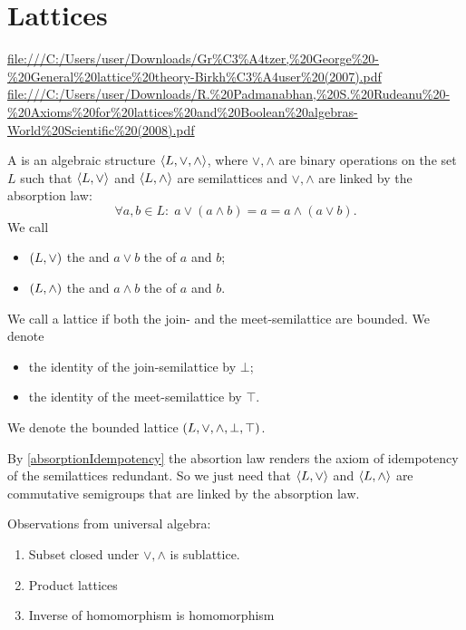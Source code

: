 \section{Lattices}
\url{file:///C:/Users/user/Downloads/Gr%C3%A4tzer,%20George%20-%20General%20lattice%20theory-Birkh%C3%A4user%20(2007).pdf}
\url{file:///C:/Users/user/Downloads/R.%20Padmanabhan,%20S.%20Rudeanu%20-%20Axioms%20for%20lattices%20and%20Boolean%20algebras-World%20Scientific%20(2008).pdf}
\begin{definition}
A  is an algebraic structure $\left\langle L,\vee, \wedge \right\rangle$, where $\vee, \wedge$ are binary operations on the set $L$ such that $\left\langle L,\vee \right\rangle$ and $\left\langle L,\wedge \right\rangle$ are semilattices and $\vee,\wedge$ are linked by the absorption law:
\[ \forall a,b\in L: \; a \vee (a \wedge b) = a = a \wedge (a\vee b). \]
We call
\begin{itemize}
\item $\left( L,\vee \right)$ the  and $a\vee b$ the  of $a$ and $b$;
\item $\left( L,\wedge \right)$ the  and $a\wedge b$ the  of $a$ and $b$.
\end{itemize}
We call a lattice  if both the join- and the meet-semilattice are bounded. We denote
\begin{itemize}
\item the identity of the join-semilattice by $\bot$;
\item the identity of the meet-semilattice by $\top$.
\end{itemize}
We denote the bounded lattice $\left( L, \vee, \wedge, \bot, \top \right)$.
\end{definition}
By \ref{absorptionIdempotency} the absortion law renders the axiom of  idempotency of the semilattices redundant. So we just need that $\left\langle L,\vee \right\rangle$ and $\left\langle L,\wedge \right\rangle$ are commutative semigroups that are linked by the absorption law.

\begin{proposition}
Observations from universal algebra:
\begin{enumerate}
\item Subset closed under $\vee,\wedge$ is sublattice.
\item Product lattices
\item Inverse of homomorphism is homomorphism
\end{enumerate}
\end{proposition}


